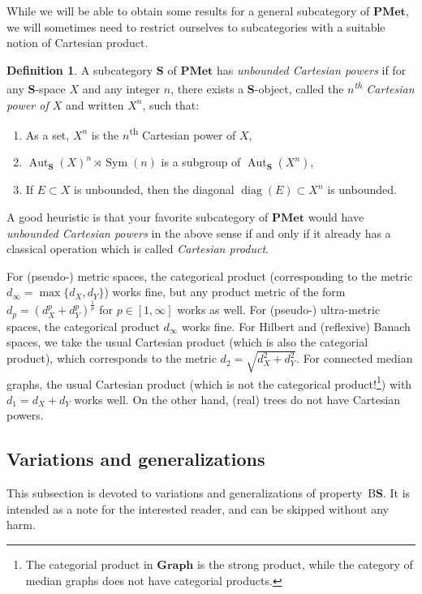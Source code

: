 \documentclass[a4paper]{article}
\theoremstyle{definition}
\newtheorem{defn}[lem]{Definition}
\newtheorem{rem}[lem]{Remark}
\DeclareMathOperator\Sym{Sym}
\DeclareMathOperator\diag{diag}
\DeclareMathOperator\Aut{Aut}
\newcommand*{\category}[1]{\textbf{#1}}
\newcommand*{\PMet}{\category{PMet}}
\newcommand*{\CatS}{\category{S}}
\newcommand*{\BS}{B\textbf{S}}
\begin{document}
While we will be able to obtain some results for a general subcategory of $\PMet$, we will sometimes need to restrict ourselves to subcategories with a suitable notion of Cartesian product.
%
%
\begin{defn}\label{Def:Cartesian}
A subcategory \CatS{} of $\PMet$ has \emph{unbounded Cartesian powers} if for any $\category S$-space $X$ and any integer $n$, there exists a $\category S$-object, called the \emph{$n$\textsuperscript{th} Cartesian power of $X$} and written $X^n$, such that:
\begin{enumerate}
\item
As a set, $X^n$ is the $n$\textsuperscript{th} Cartesian power of $X$,
\item\label{Item:Product}
$\Aut_{\CatS}(X)^n\rtimes \Sym(n)$ is a subgroup of $\Aut_{\CatS}(X^n)$,
\item\label{Condidef:2}
If $E\subset X$ is unbounded, then the diagonal $\diag(E)\subset X^n$ is unbounded.
\end{enumerate}
\end{defn}
%
%
A good heuristic is that your favorite subcategory of $\PMet$ would have \emph{unbounded Cartesian powers} in the above sense if and only if it already has a classical operation which is called \emph{Cartesian product}.

For (pseudo-) metric spaces, the categorical product (corresponding to the metric $d_\infty=\max\{d_X,d_Y\}$) works fine, but any product metric of the form $d_p=(d_X^p+d_Y^p)^{\frac1p}$ for $p\in[1,\infty]$ works as well.
For (pseudo-) ultra-metric spaces, the categorical product $d_\infty$ works fine.
For Hilbert and (reflexive) Banach spaces, we take the usual Cartesian product (which is also the categorial product), which corresponds to the metric $d_2=\sqrt{d_X^2+d_Y^2}$.
For connected median graphs, the usual Cartesian product (which is not the categorical product!\footnote{The categorial product in $\category{Graph}$ is the strong product, while the category of median graphs does not have categorial products.}) with $d_1=d_X+d_Y$ works well.
On the other hand, (real) trees do not have Cartesian powers.
%
%
\subsection{Variations and generalizations}
This subsection is devoted to variations and generalizations of property~\BS.
It is intended as a note for the interested reader, and can be skipped without any harm.
%
%
%
%
%
\end{document}

